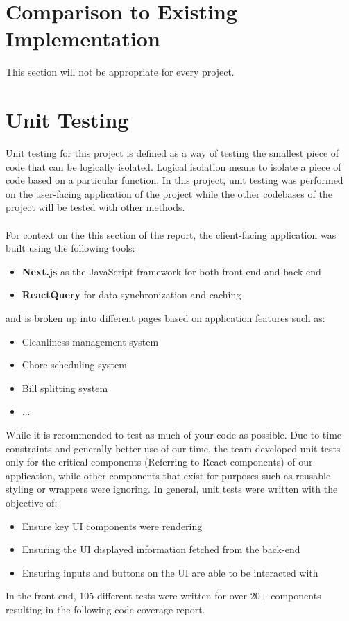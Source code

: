 \documentclass[12pt, titlepage]{article}
\begin{document}
\section{Comparison to Existing Implementation}	

This section will not be appropriate for every project.

\section{Unit Testing}
Unit testing for this project is defined as a way of testing the smallest piece of code that can be logically isolated. Logical isolation means to isolate a piece of code based on a particular function. In this project, unit testing was performed on the user-facing application of the project while the other codebases of the project will be tested with other methods.\\\\For context on the this section of the report, the client-facing application was built using the following tools:
\begin{itemize}
\item \textbf{Next.js} as the JavaScript framework for both front-end and back-end
\item \textbf{ReactQuery} for data synchronization and caching
\end{itemize}
and is broken up into different pages based on application features such as:
\begin{itemize}
\item Cleanliness management system
\item Chore scheduling system
\item Bill splitting system
\item ...
\end{itemize}
While it is recommended to test as much of your code as possible. Due to time constraints and generally better use of our time, the team developed unit tests only for the critical components (Referring to React components) of our application, while other components that exist for purposes such as reusable styling or wrappers were ignoring. In general, unit tests were written with the objective of:
\begin{itemize}
\item Ensure key UI components were rendering
\item Ensuring the UI displayed information fetched from the back-end
\item Ensuring inputs and buttons on the UI are able to be interacted with
\end{itemize}
In the front-end, 105 different tests were written for over 20+ components resulting in the following code-coverage report.
\end{document}

